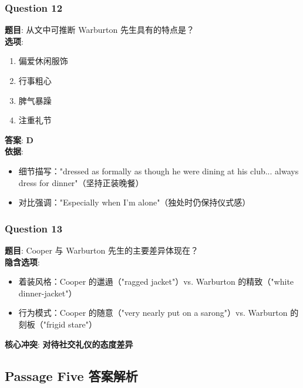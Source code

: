 \documentclass{article}
\begin{document}
\subsubsection*{Question 12}
\textbf{题目}: 从文中可推断 Warburton 先生具有的特点是？ \\
\textbf{选项}: 
\begin{enumerate}[label=\Alph*)]
    \item 偏爱休闲服饰
    \item 行事粗心
    \item 脾气暴躁
    \item 注重礼节
\end{enumerate}
\textbf{答案}: \textbf{D} \\
\textbf{依据}:
\begin{itemize}
    \item 细节描写："dressed as formally as though he were dining at his club... always dress for dinner"（坚持正装晚餐）
    \item 对比强调："Especially when I'm alone"（独处时仍保持仪式感）
\end{itemize}

\subsubsection*{Question 13}
\textbf{题目}: Cooper 与 Warburton 先生的主要差异体现在？ \\
\textbf{隐含选项}:
\begin{itemize}
    \item 着装风格：Cooper 的邋遢（"ragged jacket"）vs. Warburton 的精致（"white dinner-jacket"）
    \item 行为模式：Cooper 的随意（"very nearly put on a sarong"）vs. Warburton 的刻板（"frigid stare"）
\end{itemize}
\textbf{核心冲突}: \textbf{对待社交礼仪的态度差异}


\subsection*{Passage Five 答案解析}
\end{document}
